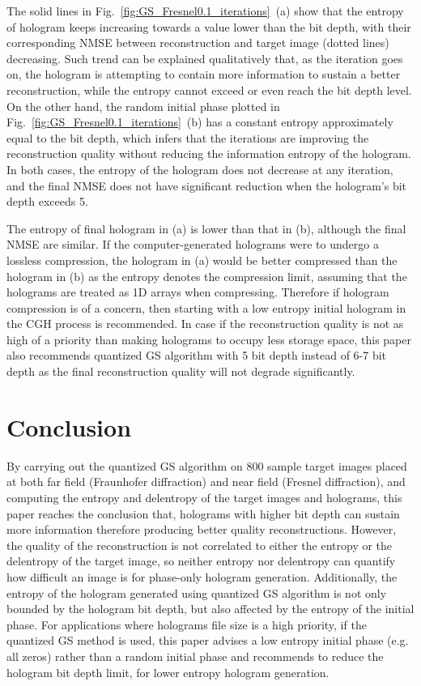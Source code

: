	The solid lines in Fig.~\ref{fig:GS_Fresnel0.1_iterations}~(a) show that the entropy of hologram keeps increasing towards a value lower than the bit depth, with their corresponding NMSE between reconstruction and target image (dotted lines) decreasing. Such trend can be explained qualitatively that, as the iteration goes on, the hologram is attempting to contain more information to sustain a better reconstruction, while the entropy cannot exceed or even reach the bit depth level. On the other hand, the random initial phase plotted in Fig.~\ref{fig:GS_Fresnel0.1_iterations}~(b) has a constant entropy approximately equal to the bit depth, which infers that the iterations are improving the reconstruction quality without reducing the information entropy of the hologram. In both cases, the entropy of the hologram does not decrease at any iteration, and the final NMSE does not have significant reduction when the hologram's bit depth exceeds 5. 
	
	The entropy of final hologram in (a) is lower than that in (b), although the final NMSE are similar. If the computer-generated holograms were to undergo a lossless compression, the hologram in (a) would be better compressed than the hologram in (b) as the entropy denotes the compression limit, assuming that the holograms are treated as 1D arrays when compressing. Therefore if hologram compression is of a concern, then starting with a low entropy initial hologram in the CGH process is recommended. In case if the reconstruction quality is not as high of a priority than making holograms to occupy less storage space, this paper also recommends quantized GS algorithm with 5 bit depth instead of 6-7 bit depth as the final reconstruction quality will not degrade significantly.
	
	
	
\section{Conclusion}
	By carrying out the quantized GS algorithm on 800 sample target images placed at both far field (Fraunhofer diffraction) and near field (Fresnel diffraction), and computing the entropy and delentropy of the target images and holograms, this paper reaches the conclusion that, holograms with higher bit depth can sustain more information therefore producing better quality reconstructions. However, the quality of the reconstruction is not correlated to either the entropy or the delentropy of the target image, so neither entropy nor delentropy can quantify how difficult an image is for phase-only hologram generation. Additionally, the entropy of the hologram generated using quantized GS algorithm is not only bounded by the hologram bit depth, but also affected by the entropy of the initial phase. For applications where holograms file size is a high priority, if the quantized GS method is used, this paper advises a low entropy initial phase (e.g. all zeros) rather than a random initial phase and recommends to reduce the hologram bit depth limit, for lower entropy hologram generation. 
	